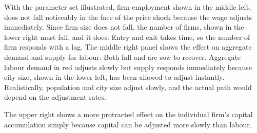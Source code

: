 With the parameter set illustrated, firm employment shown in the middle left, does not fall noticeably in the face of the price shock because the wage adjusts immediately.  Since firm size does not fall, the number of firms, shown in the lower right must fall, and it does. Entry and exit takes time, so the number of firm responds with a lag. 
The middle right panel shows the effect  on aggregate demand and supply for labour. Both fall and are sow to recover. Aggregate labour demand in red adjusts slowly but supply responds immediately because city size, shown in the lower left,  has been allowed to adjust instantly. Realistically, population and city size adjust slowly, and the actual path would depend on the adjustment rates.

The upper right shows a more protracted effect on the individual firm's capital accumulation simply because capital can be adjusted more slowly than labour. 

